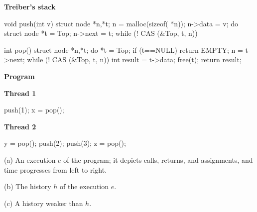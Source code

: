 \begin{figure*}[t]
  \lstset{numbers=left, 
          numberstyle=\tiny\tt, 
          stepnumber=1, 
          firstnumber=1,
          numbersep=4pt}
  \footnotesize
    \lstset{numbers=none}
  \begin{minipage}[c]{50mm}
    {\normalsize \textbf{Treiber's stack}}
    \begin{program}
void push(int v) {
  struct node *n,*t;
  n = malloc(sizeof( *n));
  n->data = v;
  do {
    struct node *t = Top;
    n->next = t;
  } while (! CAS (&Top, t, n))
}

int pop() {
  struct node *n,*t;
  do {
    *t = Top;
    if (t==NULL)
      return EMPTY;
    n = t->next;
  } while (! CAS (&Top, t, n))
  int result = t->data;
  free(t);
  return result;
}
    \end{program}
    {\normalsize\bf Program} \\[1mm]
    \begin{minipage}[b]{17mm}
      \textbf{Thread 1}
      \begin{program}
push(1);
x = pop();
      \end{program}
      \vspace{6.3mm}
    \end{minipage}
    \begin{minipage}[b]{16mm}
      \textbf{Thread 2}
      \begin{program}
y = pop();
push(2);
push(3);
z = pop();
      \end{program}
    \end{minipage}
  \end{minipage}
  \begin{minipage}[c]{130mm}
    
    \centering
    \medskip
    (a) An execution $e$ of the program; it depicts calls,
    returns, and assignments, and time progresses from left to right.
    
    \bigskip
    \begin{minipage}[c]{7cm}
    

    \centering
    \vspace{4mm}
    (b) The history $h$ of the execution $e$.
    \end{minipage}
    \begin{minipage}[c]{4cm}
    \centering
    

    \centering
    (c) A history weaker than $h$.
    \end{minipage}


\end{minipage}
\end{figure*}
